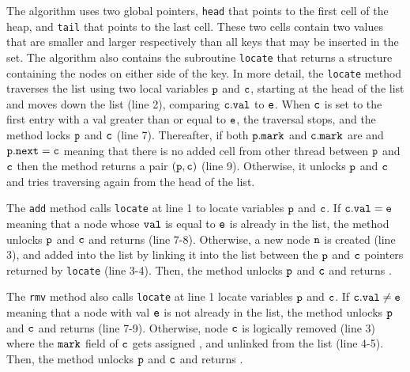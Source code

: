 % 
The algorithm uses two global pointers, {\tt head} that points to  the first cell of the heap, and {\tt tail} that points to the last cell.  
These two cells contain two values that are smaller 
and larger respectively than all keys that may be                     
inserted in the set. The algorithm also contains the subroutine {\tt locate} that returns a structure containing the nodes on either side of the key. In more detail, the {\tt locate} method traverses the list using two local variables ${\tt p}$ and $\tt c$, starting at the head of the list and moves down the list (line 2), comparing ${\tt c.val}$ to ${\tt e}$. When $\tt c$ is set to the
first entry with a val greater than or equal to $\tt e$, the traversal stops, and the
method locks $\tt p$ and $\tt c$ (line 7). Thereafter, if both $\tt p.mark$ and $\tt c.mark$ are \false \; and ${\tt p.next = c}$ meaning that there is no added cell from other thread between $\tt p$ and $\tt c$ then the method returns a pair $\tt (p,c)$ (line 9). Otherwise, it unlocks $\tt p$ and $\tt c$ and tries traversing again from the head of the list.


%

 


The {\tt add} method calls {\tt locate} at line 1 to locate variables $\tt p$ and $\tt c$. If $\tt c.val = e$ meaning that a node whose $\tt val$ is equal to $\tt e$ is already in the list, the method unlocks $\tt p$ and $\tt c$ and returns \false \; (line 7-8). Otherwise, a new node $\tt n$ is created (line 3), and added into the list by linking it into the list between the $\tt p$ and $\tt c$ pointers returned by
{\tt locate} (line 3-4). Then, the method unlocks $\tt p$ and $\tt c$ and returns \true.  

The {\tt rmv} method also calls {\tt locate} at line 1 locate variables $\tt p$ and $\tt c$. If $\tt c.val \neq e$ meaning that a node with val $\tt e$ is not already in the list, the method unlocks $\tt p$ and $\tt c$ and returns \false (line 7-9). Otherwise, node $\tt c$ is logically removed (line 3) where the $\tt mark$ field of $\tt c$ gets assigned \true, and unlinked from the list (line 4-5). Then, the method unlocks $\tt p$ and $\tt c$ and returns \true.  

